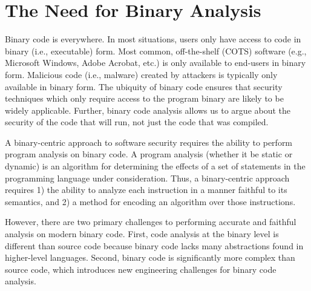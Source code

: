 \section{The Need for Binary Analysis}
\label{vine:introduction}



Binary code is everywhere. In most situations, users only have access
to code in binary (i.e., executable) form.  Most common, off-the-shelf
(COTS) software (e.g., Microsoft Windows, Adobe Acrobat, etc.) is only
available to end-users in binary form.  Malicious code (i.e., malware)
created by attackers is typically only available in binary form.  The
ubiquity of binary code ensures that security techniques which only
require access to the program binary are likely to be widely
applicable. Further, binary code analysis allows us to argue about the
security of the code that will run, not just the code that was
compiled.


A binary-centric approach to software security requires the ability to
perform program analysis on binary code. A program analysis (whether
it be static or dynamic) is an algorithm for determining the effects
of a set of statements in the programming language under
consideration.  Thus, a binary-centric approach requires 1) the
ability to analyze each instruction in a manner faithful to its
semantics, and 2) a method for encoding an algorithm over those
instructions.

However, there are two primary challenges to performing accurate and
faithful analysis on modern binary code. First, code analysis at the
binary level is different than source code because binary code lacks
many abstractions found in higher-level languages. Second, binary code
is significantly more complex than source code, which introduces new
engineering challenges for binary code analysis.  


